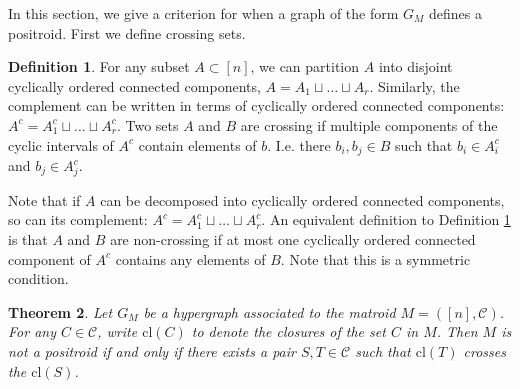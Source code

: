 \documentclass[11pt]{article}
\newcommand{\cl}{\textrm{cl}}
\newcommand{\sC}{\mathscr{C}}
\newtheorem{thm}{Theorem}[section]
\theoremstyle{remark}
\theoremstyle{definition}
\newtheorem{dfn}[thm]{Definition}
\begin{document}
In this section, we give a criterion for when a graph of the form $G_M$ defines a positroid. First we define crossing sets.

\begin{dfn} \label{dfn:crossingsets}
    For any subset $A \subset [n]$, we can partition $A$ into disjoint cyclically ordered connected components, $A = A_1 \sqcup \ldots \sqcup A_r$. Similarly, the complement can be written in terms of cyclically ordered connected components: $A^c = A_1^c \sqcup \ldots \sqcup A_r^c$. Two sets $A$ and $B$ are crossing if multiple components of the cyclic intervals of $A^c$ contain elements of $b$. I.e. there $b_i, b_j \in B$ such that $b_i \in A^c_i$ and $b_j \in A^c_j$. 
\end{dfn}

Note that if $A$ can be decomposed into cyclically ordered connected components, so can its complement: $A^c = A^c_1 \sqcup \ldots \sqcup A^c_r$. An equivalent definition to Definition \ref{dfn:crossingsets} is that $A$ and $B$ are non-crossing if at most one cyclically ordered connected component of $A^c$ contains any elements of $B$. Note that this is a symmetric condition.

\begin{thm}
Let $G_M$ be a hypergraph associated to the matroid $M = ([n], \sC)$. For any $C\in \sC$, write $\cl(C)$ to denote the closures of the set $C$ in $M$. Then $M$ is not a positroid if and only if there exists a pair $S, T \in \sC$ such that $\cl(T)$ crosses the $\cl(S)$.
\end{thm} 
\end{document}
